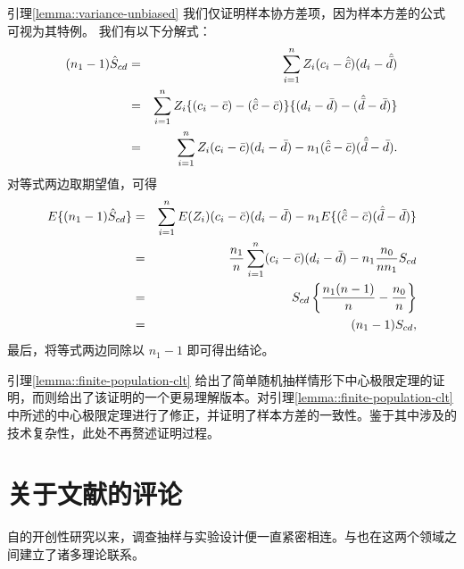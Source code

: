 \begin{myproof}{引理}{\ref{lemma::variance-unbiased}} 
我们仅证明样本协方差项，因为样本方差的公式可视为其特例。
我们有以下分解式：
\begin{eqnarray*}
(n_1 - 1)  \hat{S}_{cd}  &=& \sum_{i=1}^n Z_i  (c_i -  \hat{\bar{c}} ) (d_i -  \hat{\bar{d}}  ) \\
&=& \sum_{i=1}^n Z_i \{    (c_i -  \bar{c}  ) - (  \hat{\bar{c}}   -  \bar{c} )  \}  \{    (d_i -  \bar{d}   ) - (  \hat{\bar{d}}    -  \bar{d}  )  \}\\
&=&\sum_{i=1}^n Z_i    (c_i -  \bar{c}  ) (d_i -  \bar{d}   )  -  n_1(  \hat{\bar{c}}   -  \bar{c} )   (  \hat{\bar{d}}    -  \bar{d}  ).
\end{eqnarray*}
对等式两边取期望值，可得
\begin{eqnarray*}
E\{ (n_1 - 1)  \hat{S}_{cd}  \} &=&   \sum_{i=1}^n E(Z_i)    (c_i -  \bar{c}  )  (d_i -  \bar{d}   )   -  n_1 E\{ (  \hat{\bar{c}}   -  \bar{c} )   (  \hat{\bar{d}}    -  \bar{d}  ) \} \\
&=& \frac{n_1}{n}  \sum_{i=1}^n     (c_i -  \bar{c}  ) (d_i -  \bar{d}   ) - n_1 \frac{n_0}{nn_1} S_{cd} \\
&=& S_{cd} \left\{   \frac{n_1(n-1)}{n} - \frac{n_0}{n} \right\} \\
&=& (n_1 - 1) S_{cd},
\end{eqnarray*}
最后，将等式两边同除以 $n_1-1$ 即可得出结论。 
\end{myproof}





\begin{myproof}{引理}{\ref{lemma::finite-population-clt}}
\citet{hajek1960limiting}给出了简单随机抽样情形下中心极限定理的证明，而\citet{lehmann2006nonparametrics}则给出了该证明的一个更易理解版本。\citet{li2017general}对引理\ref{lemma::finite-population-clt}中所述的中心极限定理进行了修正，并证明了样本方差的一致性。鉴于其中涉及的技术复杂性，此处不再赘述证明过程。 
\end{myproof}



\section{关于文献的评论}


自\citet{neyman1934two, neyman1935statistical}的开创性研究以来，调查抽样与实验设计便一直紧密相连。\citet{li2017general}与\citet{mukerjee2018using}也在这两个领域之间建立了诸多理论联系。 



